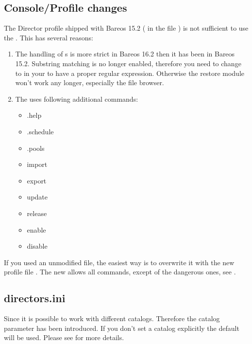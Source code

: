 \subsection{Console/Profile changes}

The \bareosWebui Director profile shipped with Bareos 15.2 ( in the file ) is not sufficient to use the .
This has several reasons:
\begin{enumerate}
  \item The handling of s is more strict in Bareos 16.2 then it has been in Bareos 15.2.
    Substring matching is no longer enabled, therefore you need to change  to 
    in your  to have a proper regular expression.
    Otherwise the restore module won't work any longer, especially the file browser.

  \item The  uses following additional commands:
\begin{itemize}
\item .help
\item .schedule
\item .pools
\item import
\item export
\item update
\item release
\item enable
\item disable
\end{itemize}

\end{enumerate}

If you used an unmodified  file,
the easiest way is to overwrite it with the new profile file .
The new  allows all commands, except of the dangerous ones, see .

\subsection{directors.ini}

Since  it is possible to work with different catalogs. Therefore the catalog parameter has been introduced. If you don't set a catalog explicitly the default  will be used. Please see  for more details.

